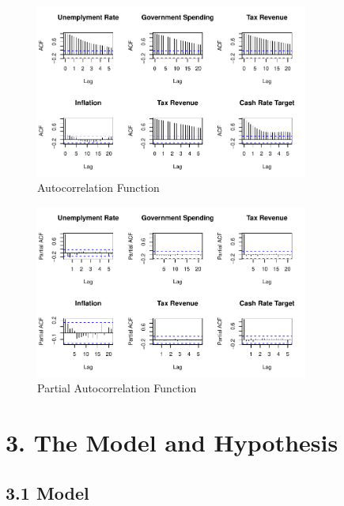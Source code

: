 \documentclass[
  letterpaper,
  DIV=11,
  numbers=noendperiod]{scrartcl}
\begin{document}
\begin{figure}

{\centering \includegraphics[width=0.8\textwidth,height=\textheight]{index_files/figure-pdf/unnamed-chunk-3-1.pdf}

}

\caption{Autocorrelation Function}

\end{figure}

\begin{figure}

{\centering \includegraphics[width=0.8\textwidth,height=\textheight]{index_files/figure-pdf/unnamed-chunk-4-1.pdf}

}

\caption{Partial Autocorrelation Function}

\end{figure}

\hypertarget{the-model-and-hypothesis}{%
\section{3. The Model and Hypothesis}\label{the-model-and-hypothesis}}

\hypertarget{model}{%
\subsection{3.1 Model}\label{model}}
\end{document}
